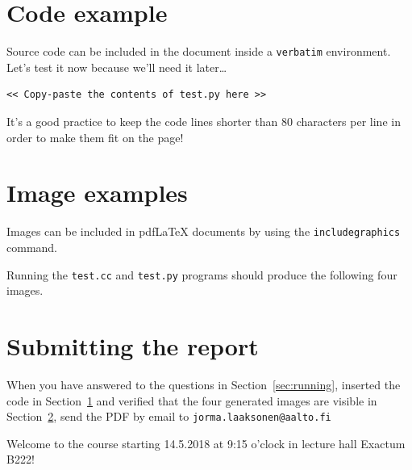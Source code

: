 \documentclass{article}
\begin{document}
\section{Code example}
\label{sec:code}

Source code can be included in the document inside a \texttt{verbatim}
environment.  Let's test it now because we'll need it later\ldots

\begin{verbatim}
<< Copy-paste the contents of test.py here >>
\end{verbatim}

It's a good practice to keep the code lines shorter than 80 characters
per line in order to make them fit on the page!

\section{Image examples}
\label{sec:images}

Images can be included in pdf\LaTeX{} documents by using the
\texttt{includegraphics} command.

Running the \texttt{test.cc} and \texttt{test.py} programs should
produce the following four images.

\bigskip
\noindent%
\setlength{\fboxsep}{0pt}%

\bigskip
\noindent%


\section{Submitting the report}

When you have answered to the questions in Section~\ref{sec:running},
inserted the code in Section~\ref{sec:code} and verified that the
four generated images are visible in Section~\ref{sec:images}, send
the PDF by email to \texttt{jorma.laaksonen@aalto.fi}

Welcome to the course starting 14.5.2018 at 9:15 o'clock in lecture
hall Exactum B222!
\end{document}
